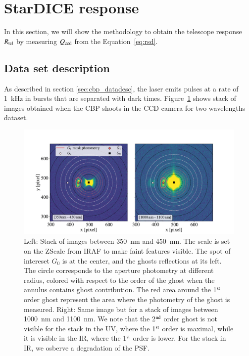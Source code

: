 \section{StarDICE response}
\label{sec:rsd}

In this section, we will show the methodology to obtain the \SD telescope response $R_{\mathrm{tel}}$ by measuring $Q_{\mathrm{ccd}}$ from the Equation~\ref{eq:rsd}.

\subsection{Data set description}
\label{sec:sd_datadesc}

As described in section \ref{sec:cbp_datadesc}, the laser emits pulses at a rate of \SI{1}{\kilo\hertz} in bursts that are separated with dark times. Figure~\ref{fig:ghost_contrast} shows stack of images obtained when the CBP shoots in the \SD CCD camera for two wavelengths dataset. 

\begin{figure}[h]
    \centering
    \includegraphics[width=\columnwidth]{fig/ghost_contrast.pdf}
    \caption{Left: Stack of images between \SI{350}{\nano\meter} and \SI{450}{\nano\meter}. The scale is set on the ZScale from IRAF to make faint features visible. The spot of intereset $G_0$ is at the center, and the ghosts reflections at its left. The circle corresponds to the aperture photometry at different radius, colored with respect to the order of the ghost when the annulus contains ghost contribution. The red area around the 1$\textsuperscript{st}$ order ghost represent the area where the photometry of the ghost is measured. Right: Same image but for a stack of images between \SI{1000}{\nano\meter} and \SI{1100}{\nano\meter}. We note that the 2$\textsuperscript{nd}$ order ghost is not visible for the stack in the UV, where the 1$\textsuperscript{st}$ order is maximal, while it is visible in the IR, where the 1$\textsuperscript{st}$ order is lower. For the stack in IR, we osberve a degradation of the \SD PSF.}
    \label{fig:ghost_contrast}
\end{figure}

